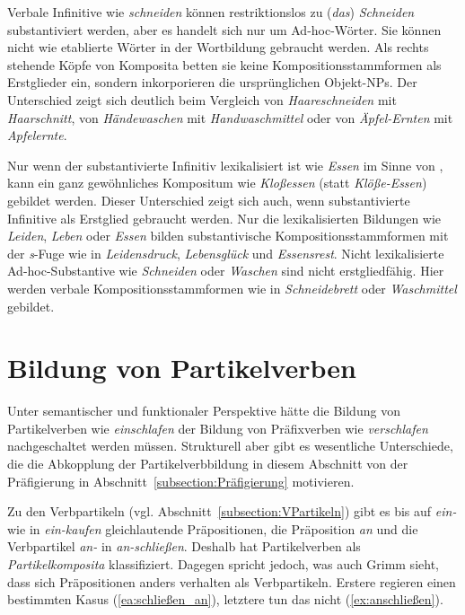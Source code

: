 Verbale Infinitive wie \textit{schneiden} können restriktionslos zu (\textit{das}) \textit{Schneiden} substantiviert werden, aber es handelt sich nur um Ad-hoc-Wörter. Sie können nicht wie etablierte Wörter in der Wortbildung gebraucht werden. Als rechts stehende Köpfe von Komposita betten sie keine Kompositionsstammformen als Erstglieder ein, sondern inkorporieren die ursprünglichen Objekt-NPs. Der Unterschied zeigt sich deutlich beim Vergleich von \textit{Haareschneiden} mit \textit{Haarschnitt}, von \textit{Händewaschen} mit \textit{Handwaschmittel} oder von \textit{Äpfel-Ernten} mit \textit{Apfelernte}. 

Nur wenn der substantivierte Infinitiv lexikalisiert ist wie \textit{Essen} im Sinne von , kann ein ganz gewöhnliches Kompositum wie \textit{Kloßessen} (statt \textit{Klöße-Essen}) gebildet werden. Dieser Unterschied zeigt sich auch, wenn substantivierte Infinitive als Erstglied gebraucht werden. Nur die lexikalisierten Bildungen wie \textit{Leiden}, \textit{Leben} oder \textit{Essen} bilden substantivische Kompositionsstammformen mit der \textit{s}-Fuge wie in \textit{Leidensdruck}, \textit{Lebensglück} und \textit{Essensrest}. Nicht lexikalisierte Ad-hoc-Substantive wie \textit{Schneiden} oder \textit{Waschen} sind nicht erstgliedfähig. Hier werden verbale Kompositionsstammformen wie in \textit{Schneidebrett} oder \textit{Waschmittel} gebildet.     


\section{Bildung von Partikelverben}\label{section:Vpt Bildung}

Unter semantischer und funktionaler Perspektive hätte die Bildung von Partikelverben wie \textit{einschlafen} der Bildung von Präfixverben wie \textit{verschlafen} nachgeschaltet werden müssen. Strukturell aber gibt es wesentliche Unterschiede, die die Abkopplung der Partikelverbbildung in diesem Abschnitt von der Präfigierung in Abschnitt~\ref{subsection:Präfigierung} motivieren.

Zu den Verbpartikeln (vgl. Abschnitt~\ref{subsection:VPartikeln}) gibt es bis auf \textit{ein-} wie in \textit{ein-kaufen} gleichlautende Präpositionen, \zB die Präposition \textit{an} und die Verbpartikel \textit{an-} in \textit{an-schließen}. Deshalb hat \citet[870]{Grimm1826Gr2} Partikelverben als \textit{Partikelkomposita} klassifiziert. Dagegen spricht jedoch, was auch Grimm sieht, dass sich Präpositionen anders verhalten als Verbpartikeln. Erstere regieren einen bestimmten Kasus (\ref{ea:schließen_an}), letztere tun das nicht (\ref{ex:anschließen}). 

